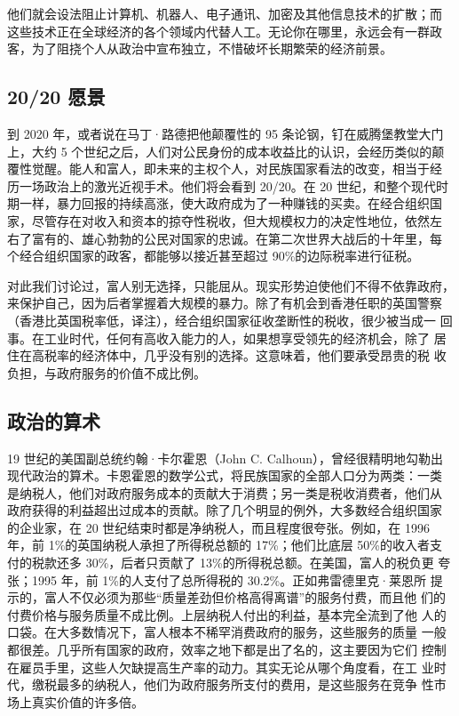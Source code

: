 他们就会设法阻止计算机、机器人、电子通讯、加密及其他信息技术的扩散；而  这些技术正在全球经济的各个领域内代替人工。无论你在哪里，永远会有一群政 客，为了阻挠个人从政治中宣布独立，不惜破坏长期繁荣的经济前景。

\subsection{20/20 愿景}
到 2020 年，或者说在马丁·路德把他颠覆性的 95 条论钢，钉在威腾堡教堂大门 上，大约 5 个世纪之后，人们对公民身份的成本收益比的认识，会经历类似的颠 覆性觉醒。能人和富人，即未来的主权个人，对民族国家看法的改变，相当于经 历一场政治上的激光近视手术。他们将会看到 20/20。在 20 世纪，和整个现代时 期一样，暴力回报的持续高涨，使大政府成为了一种赚钱的买卖。在经合组织国 家，尽管存在对收入和资本的掠夺性税收，但大规模权力的决定性地位，依然左 右了富有的、雄心勃勃的公民对国家的忠诚。在第二次世界大战后的十年里，每 个经合组织国家的政客，都能够以接近甚至超过 90\%的边际税率进行征税。

对此我们讨论过，富人别无选择，只能屈从。现实形势迫使他们不得不依靠政府， 来保护自己，因为后者掌握着大规模的暴力。除了有机会到香港任职的英国警察 （香港比英国税率低，译注），经合组织国家征收垄断性的税收，很少被当成一 回事。在工业时代，任何有高收入能力的人，如果想享受领先的经济机会，除了 居住在高税率的经济体中，几乎没有别的选择。这意味着，他们要承受昂贵的税 收负担，与政府服务的价值不成比例。

\subsection{政治的算术}
19 世纪的美国副总统约翰·卡尔霍恩（John C. Calhoun），曾经很精明地勾勒出 现代政治的算术。卡恩霍恩的数学公式，将民族国家的全部人口分为两类：一类  是纳税人，他们对政府服务成本的贡献大于消费；另一类是税收消费者，他们从 政府获得的利益超出过成本的贡献。除了几个明显的例外，大多数经合组织国家 的企业家，在 20 世纪结束时都是净纳税人，而且程度很夸张。例如，在 1996 年，前 1\%的英国纳税人承担了所得税总额的 17\%；他们比底层 50\%的收入者支 付的税款还多 30\%，后者只贡献了 13\%的所得税总额。在美国，富人的税负更 夸张；1995 年，前 1\%的人支付了总所得税的 30.2\%。正如弗雷德里克·莱恩所 提示的，富人不仅必须为那些“质量差劲但价格高得离谱”的服务付费，而且他 们的付费价格与服务质量不成比例。上层纳税人付出的利益，基本完全流到了他 人的口袋。在大多数情况下，富人根本不稀罕消费政府的服务，这些服务的质量 一般都很差。几乎所有国家的政府，效率之地下都是出了名的，这主要因为它们 控制在雇员手里，这些人欠缺提高生产率的动力。其实无论从哪个角度看，在工 业时代，缴税最多的纳税人，他们为政府服务所支付的费用，是这些服务在竞争 性市场上真实价值的许多倍。

